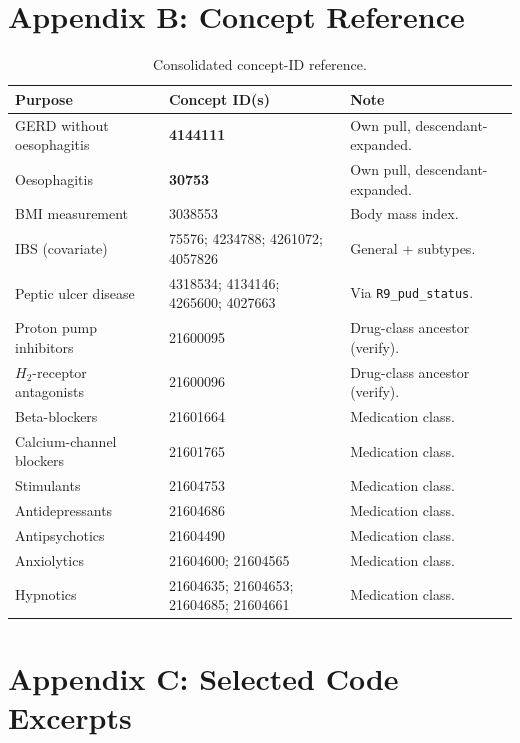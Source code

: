 \documentclass[11pt]{article}
\newcommand{\code}[1]{\texttt{\small #1}}
\begin{document}
\section{Appendix B: Concept Reference}
\begin{table}[h]
\centering
\footnotesize
\begin{tabular}{@{}p{5.0cm} p{4.2cm} p{3.6cm}@{}}
\toprule
\textbf{Purpose} & \textbf{Concept ID(s)} & \textbf{Note} \\
\midrule
GERD without oesophagitis & \textbf{4144111} & Own pull, descendant-expanded. \\
Oesophagitis & \textbf{30753} & Own pull, descendant-expanded. \\
BMI measurement & 3038553 & Body mass index. \\
IBS (covariate) & 75576; 4234788; 4261072; 4057826 & General + subtypes. \\
Peptic ulcer disease & 4318534; 4134146; 4265600; 4027663 & Via \code{R9_pud_status}. \\
Proton pump inhibitors & 21600095 & Drug-class ancestor (verify). \\
$H_2$-receptor antagonists & 21600096 & Drug-class ancestor (verify). \\
Beta-blockers & 21601664 & Medication class. \\
Calcium-channel blockers & 21601765 & Medication class. \\
Stimulants & 21604753 & Medication class. \\
Antidepressants & 21604686 & Medication class. \\
Antipsychotics & 21604490 & Medication class. \\
Anxiolytics & 21604600; 21604565 & Medication class. \\
Hypnotics & 21604635; 21604653; 21604685; 21604661 & Medication class. \\
\bottomrule
\end{tabular}
\caption{Consolidated concept-ID reference.}
\end{table}

\section{Appendix C: Selected Code Excerpts}
\end{document}
